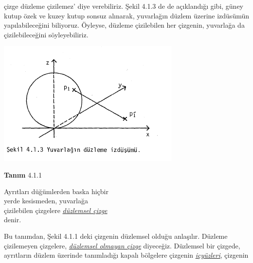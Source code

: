 \documentclass[11pt]{amsbook}
\begin{document}
çizge düzleme çizilemez' diye verebiliriz. Şekil 4.1.3 de de açıklandığı gibi, güney kutup özek ve kuzey kutup sonsuz alınarak, yuvarlağın düzlem üzerine izdüsümün yapılabileceğini biliyoruz.
Öyleyse, düzleme çizilebilen her çizgenin, yuvarlağa da çizilebileceğini söyleyebiliriz.
\begin{center}
\includegraphics{images/figure-1}
\end{center}

\textbf{Tanım} 4.1.1 \begin{center}
Ayrıtları düğümlerden baska hiçbir\\
yerde kesismeden, yuvarlağa\\
çizilebilen çizgelere \underline{\textit{düzlemsel çizge}} \\denir.
\end{center}


Bu tanımdan, Şekil 4.1.1 deki çizgenin düzlemsel olduğu anlaşılır. Düzleme çizilemeyen çizgelere, \underline{\textit{düzlemsel olmayan çizge}} diyeceğiz. Düzlemsel bir çizgede, ayrıtların düzlem üzerinde tanımladığı kapalı bölgelere çizgenin \underline{\textit{içyüzleri}}, çizgenin
\end{document}

